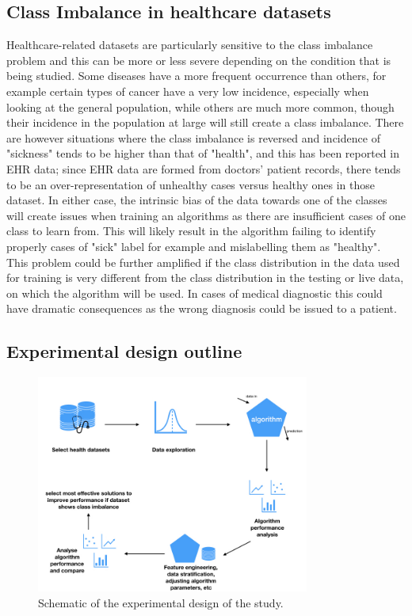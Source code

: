 \subsection{Class Imbalance in healthcare datasets}
Healthcare-related datasets are particularly sensitive to the class imbalance problem and this can be more or less severe depending on the condition that is being studied. Some diseases have a more frequent occurrence than others, for example certain types of cancer have a very low incidence, especially when looking at the general population, while others are much more common, though their incidence in the population at large will still create a class imbalance. There are however situations where the class imbalance is reversed and incidence of "sickness" tends to be higher than that of "health", and this has been reported in EHR data; since EHR data are formed from doctors' patient records, there tends to be an over-representation of unhealthy cases versus healthy ones in those dataset. In either case, the intrinsic bias of the data towards one of the classes will create issues when training an algorithms as there are insufficient cases of one class to learn from. This will likely result in the algorithm failing to identify properly cases of "sick" label for example and mislabelling them as "healthy". This problem could be further amplified if the class distribution in the data used for training is very different from the class distribution in the testing or live data, on which the algorithm will be used.
In cases of medical diagnostic this could have dramatic consequences as the wrong diagnosis could be issued to a patient. 


\subsection{Experimental design outline}


\begin{figure}[H]
    \centering
    \includegraphics[width=0.8\textwidth]{ThesisTemplate/usingLatex/images/Chapter3Figures001.jpeg}
    \caption{Schematic of the experimental design of the study.}
    \label{fig:expDesign}
\end{figure}

